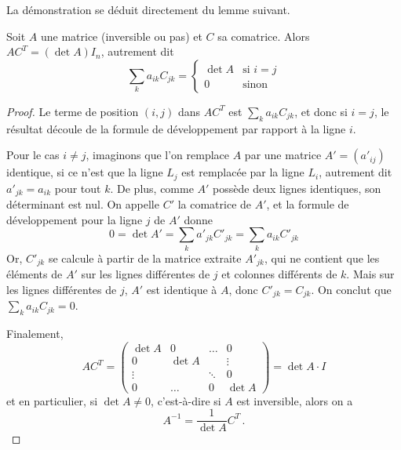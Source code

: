 \documentclass[class=report,crop=false]{standalone}
\begin{document}
La démonstration se déduit directement du lemme suivant.
\begin{lemme}
Soit $A$ une matrice (inversible ou pas) et $C$ sa comatrice.
Alors $A C^T = (\det A) I_n$, autrement dit
\[
\sum_k a_{ik} C_{jk} =
\left\{ \begin{array}{ll} \det A & \text{si } i=j \\ 0 & \text{sinon}\end{array} \right.
\]
\end{lemme}


\begin{proof}
Le terme de position $(i,j)$ dans $A C^T$ est $\sum_k a_{ik} C_{jk}$, et
donc si $i=j$, le résultat découle de la formule de développement par rapport à la ligne $i$.

Pour le cas $i \neq j$, imaginons que l'on remplace $A$ par une matrice $A'=(a'_{ij})$ identique,
si ce n'est que la ligne $L_j$ est remplacée par la ligne $L_i$, autrement dit $a'_{jk} = a_{ik}$
pour tout $k$. De plus, comme $A'$ possède deux lignes identiques, son déterminant est nul.
On appelle $C'$ la comatrice de $A'$, et la formule de développement
pour la ligne $j$ de $A'$ donne
\[
0 = \det A' = \sum_k a'_{jk} C'_{jk} = \sum_k a_{ik} C'_{jk}
\]
Or, $C'_{jk}$ se calcule à partir de la matrice extraite $A'_{jk}$, qui ne contient que les éléments
de $A'$ sur les lignes différentes de $j$ et colonnes différents de $k$. Mais sur les lignes
différentes de $j$, $A'$ est identique à $A$, donc $C'_{jk} = C_{jk}$. On conclut que
$\sum_k a_{ik} C_{jk} = 0$.

Finalement,
\[
 AC^T = \left(
\begin{array}{cccc}
\det A & 0 & \dots & 0\\
0 & \det A &&\vdots\\
\vdots &&\ddots & 0\\
0&\dots &0 & \det A
\end{array}\right) = \det A\cdot  I
\]
et en particulier, si $\det A \neq 0$, c'est-à-dire si $A$ est inversible, alors on a
$$
A^{-1} = \frac{1}{\det A} C^T\, .
$$


\end{proof}


\end{document}
